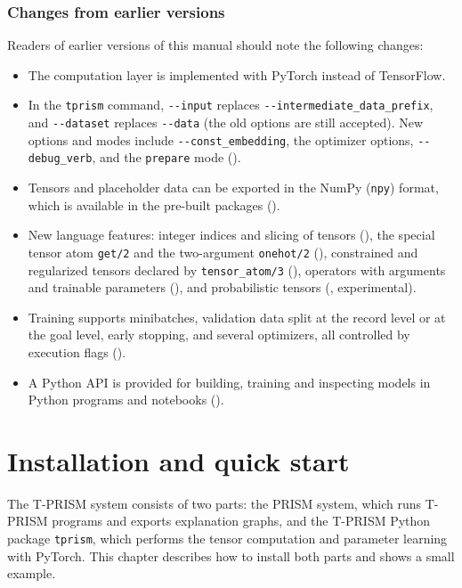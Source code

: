 \documentclass[a4paper]{report}
\begin{document}
\subsection*{Changes from earlier versions}
Readers of earlier versions of this manual should note the following changes:
\begin{itemize}
	\item The computation layer is implemented with PyTorch instead of TensorFlow.
	\item In the {\tt tprism} command, {\tt -{}-input} replaces {\tt -{}-intermediate\_data\_prefix},
	and {\tt -{}-dataset} replaces {\tt -{}-data} (the old options are still accepted).
	New options and modes include {\tt -{}-const\_embedding}, the optimizer options,
	{\tt -{}-debug\_verb}, and the {\tt prepare} mode ().
	\item Tensors and placeholder data can be exported in the NumPy ({\tt npy}) format,
	which is available in the pre-built packages ().
	\item New language features: integer indices and slicing of tensors
	(), the special tensor atom {\tt get/2} and the two-argument
	{\tt onehot/2} (), constrained and regularized tensors
	declared by {\tt tensor\_atom/3} (), operators with
	arguments and trainable parameters (), and probabilistic
	tensors (, experimental).
	\item Training supports minibatches, validation data split at the record level or at the
	goal level, early stopping, and several optimizers, all controlled by execution
	flags ().
	\item A Python API is provided for building, training and inspecting models in Python
	programs and notebooks ().
\end{itemize}

\tableofcontents
\clearpage
{}

\chapter{Installation and quick start}
\label{chap:install}

The T-PRISM system consists of two parts: the PRISM system, which runs
T-PRISM programs and exports explanation graphs, and the T-PRISM Python
package {\tt tprism}, which performs the tensor computation and
parameter learning with PyTorch.  This chapter describes how to install
both parts and shows a small example.
\end{document}
